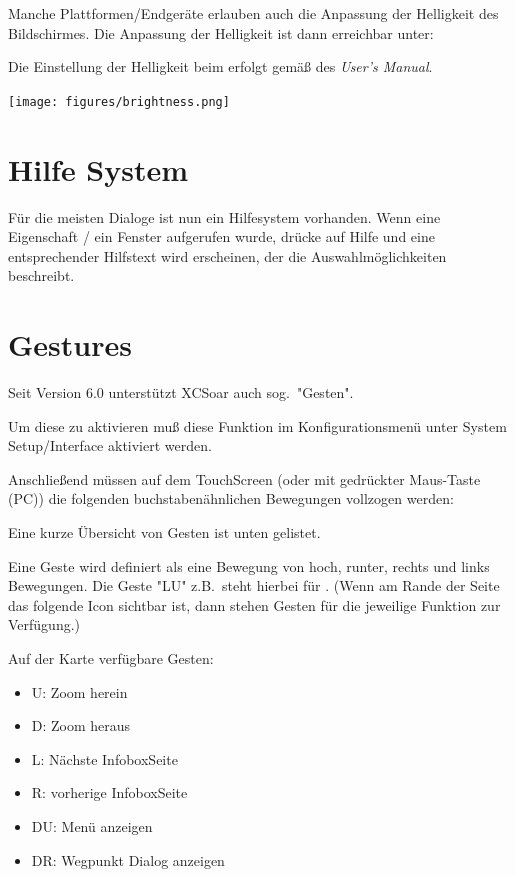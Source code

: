  Manche Plattformen/Endgeräte erlauben auch die Anpassung der Helligkeit des Bildschirmes.
Die Anpassung der Helligkeit ist dann erreichbar unter:

\halt
\begin{quote}
\blink{}\blink{}
\end{quote}

Die Einstellung der Helligkeit beim \al erfolgt gemäß des {\em \al User's Manual}.

\begin{center}
\texttt{[image: figures/brightness.png]}
\end{center}

\section{Hilfe System}
  Für die meisten Dialoge ist nun ein Hilfesystem vorhanden.
  Wenn eine Eigenschaft / ein Fenster aufgerufen wurde, drücke auf Hilfe und eine entsprechender Hilfstext wird erscheinen, der die Auswahlmöglichkeiten  beschreibt.

  \section{Gestures}\label{sec:gestures}
Seit Version 6.0 unterstützt \textsf{XCSoar} auch sog.\  "Gesten".

Um diese zu aktivieren muß diese Funktion im Konfigurationsmenü unter System Setup/Interface aktiviert werden. 

Anschließend müssen auf dem TouchScreen (oder mit gedrückter Maus-Taste (\textsf{PC})) die folgenden buchstabenähnlichen Bewegungen vollzogen werden:

Eine kurze Übersicht von Gesten ist unten gelistet.

Eine Geste wird definiert als eine Bewegung von hoch, runter, rechts und links Bewegungen.
Die Geste "LU"  z.B.\   steht hierbei für .
(Wenn am Rande der Seite das folgende Icon sichtbar ist, dann  stehen Gesten für die jeweilige Funktion zur Verfügung.)

Auf der Karte verfügbare Gesten:
\begin{itemize}
\item U: Zoom herein
\item D: Zoom heraus
\item L: Nächste InfoboxSeite
\item R: vorherige InfoboxSeite
\item DU: Menü anzeigen
\item DR: Wegpunkt Dialog anzeigen
\end{itemize}


